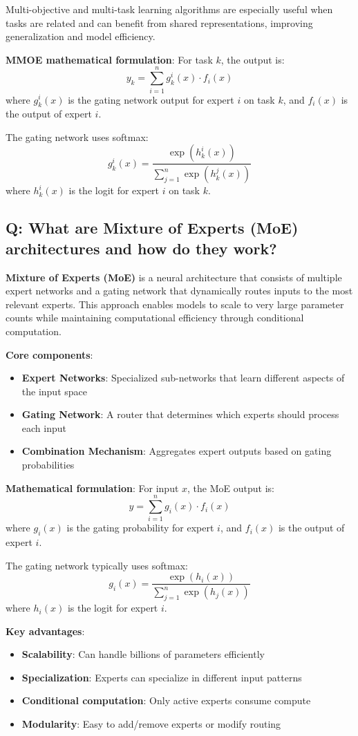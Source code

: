 Multi-objective and multi-task learning algorithms are especially useful when tasks are related and can benefit from shared representations, improving generalization and model efficiency.

\textbf{MMOE mathematical formulation}:
For task \(k\), the output is:
\[
y_k = \sum_{i=1}^{n} g_k^i(x) \cdot f_i(x)
\]
where \(g_k^i(x)\) is the gating network output for expert \(i\) on task \(k\), and \(f_i(x)\) is the output of expert \(i\).

The gating network uses softmax:
\[
g_k^i(x) = \frac{\exp(h_k^i(x))}{\sum_{j=1}^{n} \exp(h_k^j(x))}
\]
where \(h_k^i(x)\) is the logit for expert \(i\) on task \(k\).

\subsection*{Q: What are Mixture of Experts (MoE) architectures and how do they work?}
\textbf{Mixture of Experts (MoE)} is a neural architecture that consists of multiple expert networks and a gating network that dynamically routes inputs to the most relevant experts. This approach enables models to scale to very large parameter counts while maintaining computational efficiency through conditional computation.

\textbf{Core components}:
\begin{itemize}
	\item \textbf{Expert Networks}: Specialized sub-networks that learn different aspects of the input space
	\item \textbf{Gating Network}: A router that determines which experts should process each input
	\item \textbf{Combination Mechanism}: Aggregates expert outputs based on gating probabilities
\end{itemize}

\textbf{Mathematical formulation}:
For input \(x\), the MoE output is:
\[
y = \sum_{i=1}^{n} g_i(x) \cdot f_i(x)
\]
where \(g_i(x)\) is the gating probability for expert \(i\), and \(f_i(x)\) is the output of expert \(i\).

The gating network typically uses softmax:
\[
g_i(x) = \frac{\exp(h_i(x))}{\sum_{j=1}^{n} \exp(h_j(x))}
\]
where \(h_i(x)\) is the logit for expert \(i\).

\textbf{Key advantages}:
\begin{itemize}
	\item \textbf{Scalability}: Can handle billions of parameters efficiently
	\item \textbf{Specialization}: Experts can specialize in different input patterns
	\item \textbf{Conditional computation}: Only active experts consume compute
	\item \textbf{Modularity}: Easy to add/remove experts or modify routing
\end{itemize}

